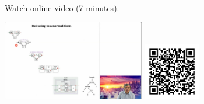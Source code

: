
\begin{minipage}{10cm}
    \href{https://act4e-spring21.netlify.app/videos/spring2021-functorial-comp-a:solving-queries:complexity.html}{Watch online video (7 minutes).}
        
    \href{https://act4e-spring21.netlify.app/videos/spring2021-functorial-comp-a:solving-queries:complexity.html}{\includegraphics[height=3.5cm]{spring2021-functorial-comp-a:solving-queries:complexity/thumbnails.jpg}}
    \href{https://act4e-spring21.netlify.app/videos/spring2021-functorial-comp-a:solving-queries:complexity.html}{\includegraphics[height=2.5cm]{spring2021-functorial-comp-a:solving-queries:complexity/qrcode.png}}
\end{minipage}
